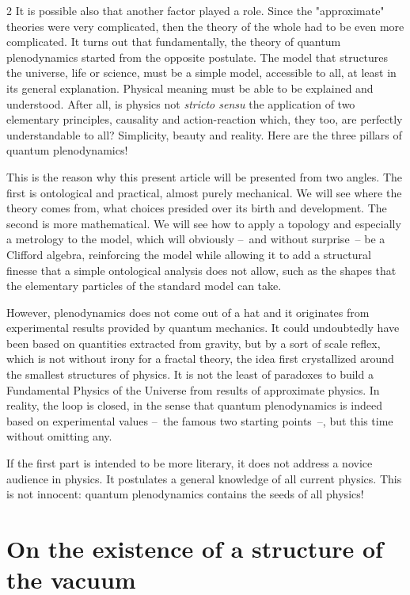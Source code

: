 \begin{multicols}{2}
	It is possible also that another factor played a role. Since the 
	"approximate" theories were very complicated, then the theory 
	of the whole had to be even more complicated. It turns out that 
	fundamentally, the theory of quantum plenodynamics started 
	from the opposite postulate. The model that structures the universe, life or 
	science, must be a simple model, accessible to all, at least in 
	its general explanation. Physical meaning must be able to be explained and 
	understood. After all, is physics not \textit{stricto sensu} 
	the application of two elementary principles, causality and 
	action-reaction which, they too, are perfectly understandable to 
	all? Simplicity, beauty and reality. Here are the three pillars of 
	quantum plenodynamics!
	
	This is the reason why this present article will be presented from 
	two angles. The first is ontological and practical, almost purely 
	mechanical. We will see where the theory comes from, what choices 
	presided over its birth and development. The second is more 
	mathematical. We will see how to apply a topology and especially a 
	metrology to the model, which will obviously --~and without surprise~-- be a 
	Clifford algebra, reinforcing the model while allowing it 
	to add a structural finesse that a simple ontological analysis 
	does not allow, such as the shapes that the elementary particles 
	of the standard model can take.
	
	However, plenodynamics does not come out of a hat and 
	it originates from experimental results provided by 
	quantum mechanics. It could undoubtedly have been based on 
	quantities extracted from gravity, but by a sort of scale 
	reflex, which is not without irony for a fractal theory, 
	the idea first crystallized around the smallest 
	structures of physics. It is not the least of paradoxes to 
	build a Fundamental Physics of the Universe from 
	results of approximate physics. In reality, the loop is 
	closed, in the sense that quantum plenodynamics is indeed based on 
	experimental values --~the famous two starting points~--, but 
	this time without omitting any.
	
	If the first part is intended to be more literary, it does not 
	address a novice audience in physics. It postulates a 
	general knowledge of all current physics. This is not 
	innocent: quantum plenodynamics contains the seeds of all 
	physics!
	\clearpage
	
	\section{On the existence of a structure of the vacuum}
	

\end{multicols}
